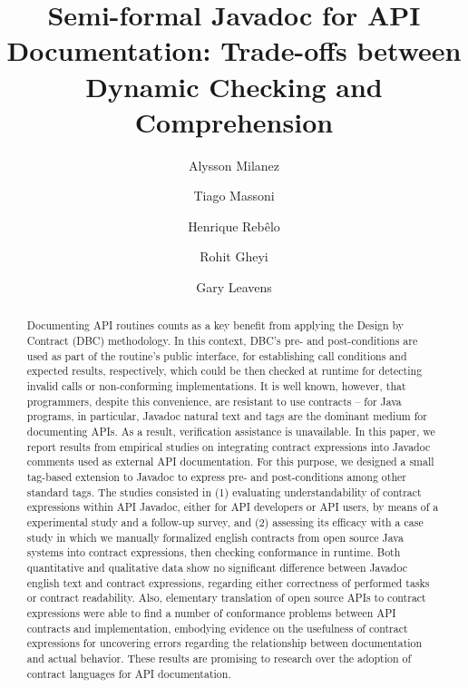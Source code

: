 \documentclass[a4paper,UKenglish]{lipics-v2018}
\title{Semi-formal Javadoc for API Documentation: Trade-offs between Dynamic Checking and Comprehension}
\author{Alysson Milanez}{Department of Systems and Computing, UFCG, Brazil}{alyssonfilgueira@copin.ufcg.edu.br}{}{}
\author{Tiago Massoni}{Department of Systems and Computing, UFCG, Brazil}{massoni@dsc.ufcg.edu.br}{}{}
\author{Henrique Reb\^{e}lo}{Informatics Center, UFPE, Brazil}{hemr@cin.ufpe.br}{}{}
\author{Rohit Gheyi}{Department of Systems and Computing, UFCG, Brazil}{rohit@dsc.ufcg.edu.br}{}{}
\author{Gary Leavens}{Department of Computer Science, UCF, USA}{leavens@cs.ucf.edu}{}{}
\newcommand{\contractjdoc}[1]{\textsc{ContractJDoc}}
\begin{document}
\maketitle

\begin{abstract}
Documenting API routines counts as a key benefit from applying the Design by Contract (DBC) methodology. 
In this context, DBC's pre- and post-conditions are used as part of the routine's public interface, for establishing call conditions and expected results, respectively, which could be then checked at runtime for detecting invalid calls or non-conforming implementations.
%
It is well known, however, that programmers, despite this convenience, are resistant to use contracts -- for Java programs, in particular, Javadoc natural text and tags are the dominant medium for documenting APIs. 
As a result, verification assistance is unavailable.
%
In this paper, we report results from empirical studies on integrating contract expressions into Javadoc comments used as external API documentation. 
For this purpose, we designed a small tag-based extension to Javadoc to express pre- and post-conditions among other standard tags.
%
The studies consisted in (1) evaluating understandability of contract expressions within API Javadoc, either for API developers or API users, by means of a experimental study and a follow-up survey, and (2) assessing its efficacy with a case study in which we manually formalized english contracts from open source Java systems into contract expressions, then checking conformance in runtime.    
%
Both quantitative and qualitative data show no significant difference between Javadoc english text and contract expressions, regarding either correctness of performed tasks or contract readability. 
Also, elementary translation of open source APIs  to contract expressions were able to find a number of conformance problems between API contracts and implementation, embodying evidence on the usefulness of contract expressions for uncovering errors regarding the relationship between documentation and actual behavior.
%
These results are promising to research over the adoption of contract languages for API documentation.
\end{abstract}













\end{document}
